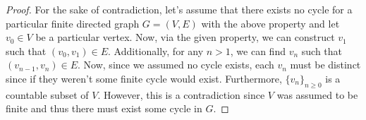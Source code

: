 \documentclass[11pt,oneside]{article}
\numberwithin{equation}{section}
\theoremstyle{definition}
\begin{document}
\begin{proof}

For the sake of contradiction, let's assume that there exists no cycle for a particular finite directed graph $G = (V,E)$ with the above property and let $v_0 \in V$ be a particular vertex. Now, via the given property, we can construct $v_1$ such that $(v_0, v_1) \in E$. Additionally, for any $n>1$, we can find $v_n$ such that $(v_{n-1},v_n) \in E$. Now, since we assumed no cycle exists, each $v_n$ must be distinct since if they weren't some finite cycle would exist. Furthermore, $\{v_n\}_{n\geq 0}$ is a countable subset of $V$. However, this is a contradiction since $V$ was assumed to be finite and thus there must exist some cycle in $G$.  


\end{proof}
\end{document}
